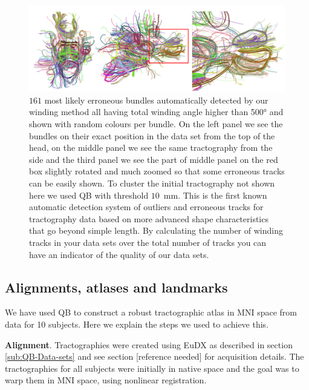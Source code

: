 \documentclass[preprint,authoryear,a4paper,10pt,onecolumn]{elsarticle}
\begin{document}
\begin{figure}
\begin{centering}
\includegraphics[scale=0.65]{last_figures/erroneous_tracks}
\par\end{centering}
\caption{$161$ most likely erroneous bundles automatically detected by
  our winding method all having total winding angle higher than \ang{500}
  and shown with random colours per bundle. On the left panel we
  see the bundles on their exact position in the data set from the top
  of the head, on the middle panel we see the same tractography from the
  side and the third panel we see the part of middle panel on the red
  box slightly rotated and much zoomed so that some erroneous tracks can
  be easily shown. To cluster the initial tractography not shown here we
  used QB with threshold $10$~mm. This is the first known automatic
  detection system of outliers and erroneous tracks for tractography
  data based on more advanced shape characteristics that go beyond
  simple length. By calculating the number of winding tracks in your
  data sets over the total number of tracks you can have an indicator of
  the quality of our data sets.\label{Flo:erroneous_tracks}}
\end{figure}

\subsection{Alignments, atlases and landmarks\label{sub:Atlases-made-easy}}

We have used QB to construct a robust tractographic atlas in MNI space
from data for 10 subjects. Here we explain the steps we used to achieve
this.

\textbf{Alignment}. Tractographies were created using EuDX as described
in section \ref{sub:QB-Data-sets} and see section
[reference needed] for acquisition details. The
tractographies for all subjects were initially in native space and the
goal was to warp them in MNI space, using nonlinear registration.
\end{document}

